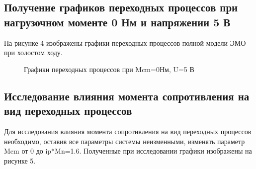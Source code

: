 \documentclass[a4paper, 12pt]{article}
\begin{document}
\begin{center}
\section{Получение графиков переходных процессов при нагрузочном моменте 0 Нм и напряжении 5 В}
\end{center}\par
На рисунке 4 изображены графики переходных процессов полной модели ЭМО при холостом ходу. 
\begin{figure}[h]
\begin{minipage}[h]{0.55\linewidth}
\end{minipage}
\hfill
\begin{minipage}[h]{0.55\linewidth}
\end{minipage}
\vfill
\begin{minipage}[h]{0.55\linewidth}
\centering{\texttt{[image: w1]} \\ $\omega$}
\end{minipage}
\hfill
\begin{minipage}[h]{0.55\linewidth}
\end{minipage}
\caption{Графики переходных процессов при Mcm=0Нм, U=5 В}
\end{figure}
\newpage
\begin{center}
\section{Исследование влияния момента сопротивления на вид переходных процессов}
\end{center}\par
Для исследования влияния момента сопротивления на вид переходных процессов необходимо, оставив все параметры системы неизменными, изменять параметр Mcm от 0 до ip*Mn=1.6. Полученные при исследовании графики изображены на рисунке 5.\\
\end{document}

